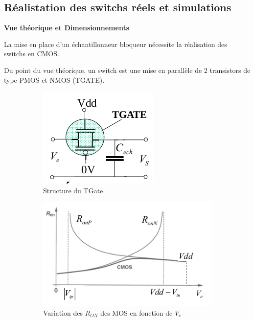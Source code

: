 \documentclass[11pt]{article}
\begin{document}
\clearpage

\subsection{R\'ealistation des switchs r\'eels et simulations}

\textbf{Vue th\'eorique et Dimensionnements}

La mise en place d'un \'echantillonneur bloqueur n\'ecessite la r\'ealisation
des switchs en CMOS.

Du point du vue th\'eorique, un switch est une mise en parall\`ele de 2 transistors
de type PMOS et NMOS (TGATE).

\begin{figure}[!htb]
  \begin{subfigure}[t]{.5\linewidth}
      \centering
      \includegraphics[width=0.7\linewidth]{tgate_.png}
      \caption{Structure du TGate}
      \label{fig:sfigtgate}
  \end{subfigure}%
  \begin{subfigure}[t]{.5\linewidth}
    \centering
    \includegraphics[width=0.9\linewidth]{var_ron.png}
    \caption{Variation des $R_{ON}$ des MOS en fonction de $V_e$}
    \label{fig:sfigron}
  \end{subfigure}%
  \caption{}
  \label{fig:figswitchth}
\end{figure}
\end{document}

